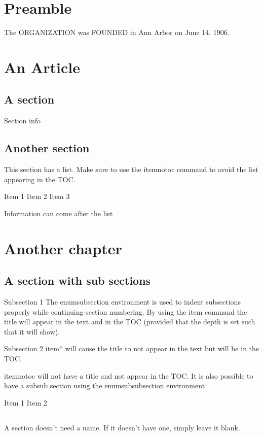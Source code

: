 \documentclass[constitution,final,withoutpreface,withoutoptional,11pt]{bylaws}
\begin{document}
\frontmatter
\maketitle
\setcounter{tocdepth}{2} %
\tableofcontents
\newpage
\mainmatter
\chapter*{Preamble}
The ORGANIZATION was FOUNDED in Ann Arbor on June 14, 1906. 

\chapter{An Article}

\section{A section}
Section info


\section{Another section}This section has a list. Make sure to use the itemnotoc command to avoid the list appearing in the TOC.

\begin{compactenum}[1.]
\itemnotoc  Item 1
\itemnotoc  Item 2
\itemnotoc Item 3
\end{compactenum}
Information can come after the list

\chapter{Another chapter}


\section{A section with sub sections}
\begin{enumsubsection}
\item{Subsection 1} The enumsubsection environment is used to indent subsections properly while continuing section numbering. By using the item command the title will appear in the text and in the TOC (provided that the depth is set such that it will show).
\item*{Subsection 2}
 item* will cause the title to not appear in the text but will be in the TOC.

\itemnotoc
 itemnotoc will not have a title and not appear in the TOC. It is also possible to have a subsub section using the enumsubsubsection environment
\begin{enumsubsubsection}

\itemnotoc Item 1
\itemnotoc Item 2


 \end{enumsubsubsection}
\end{enumsubsection}

\section{}
A section doesn't need a name. If it doesn't have one, simply leave it blank.
\end{document}
